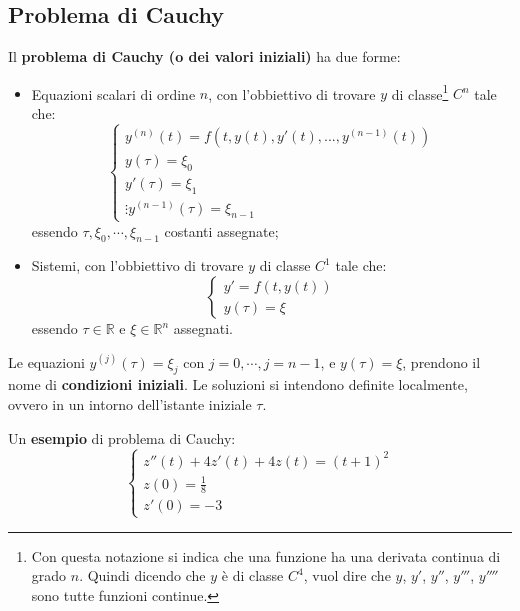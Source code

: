 \documentclass[a4paper]{article}
\newcommand{\definition}[1]{\textcolor{Red3}{\textbf{#1}}}
\newcommand{\example}[1]{\textcolor{Green4}{\textbf{#1}}}
\begin{document}
	\subsection{Problema di Cauchy}

	Il \definition{problema di Cauchy (o dei valori iniziali)} ha due forme:
	\begin{itemize}
		\item Equazioni scalari di ordine $n$, con l'obbiettivo di trovare $y$ di classe\footnote{Con questa notazione si indica che una funzione ha una derivata continua di grado $n$. Quindi dicendo che $y$ è di classe $C^{4}$, vuol dire che $y$, $y'$, $y''$, $y'''$, $y''''$ sono tutte funzioni continue.} $C^{n}$ tale che:
		\begin{equation*}
			\begin{cases}
				y^{\left(n\right)}\left(t\right) = f\left(t, y\left(t\right), y'\left(t\right), ..., y^{\left(n-1\right)}\left(t\right)\right) \\
				y\left(\tau\right) = \xi_{0} \\
				y'\left(\tau\right) = \xi_{1} \\
				\vdots 
				y^{\left(n-1\right)}\left(\tau\right) = \xi_{n-1}
			\end{cases}
		\end{equation*}
		essendo $\tau, \xi_{0}, \cdots, \xi_{n-1}$ costanti assegnate;

		\item Sistemi, con l'obbiettivo di trovare $y$ di classe $C^{1}$ tale che:
		\begin{equation*}
			\begin{cases}
				y'=f\left(t, y\left(t\right)\right) \\
				y\left(\tau\right) = \xi
			\end{cases}
		\end{equation*}
		essendo $\tau \in \mathbb{R}$ e $\xi \in \mathbb{R}^{n}$ assegnati.
	\end{itemize}
	Le equazioni $y^{\left(j\right)}\left(\tau\right) = \xi_{j}$ con $j =0, \cdots, j=n-1$, e $y\left(\tau\right) = \xi$, prendono il nome di \definition{condizioni iniziali}. Le soluzioni si intendono definite localmente, ovvero in un intorno dell'istante iniziale $\tau$.\newline

	\noindent
	Un \example{esempio} di problema di Cauchy:
	\begin{equation*}
		\begin{cases}
			z''\left(t\right) + 4z'\left(t\right) + 4z\left(t\right) = \left(t+1\right)^{2} \\
			z\left(0\right) = \frac{1}{8} \\
			z'\left(0\right) = -3
		\end{cases}
	\end{equation*}

\end{document}
